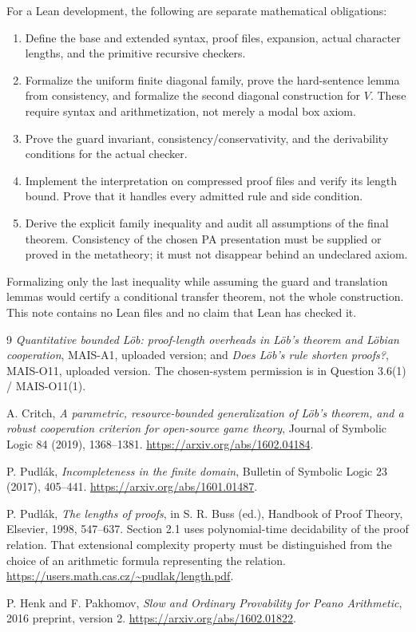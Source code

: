 \documentclass[11pt]{article}
\theoremstyle{remark}
\begin{document}
For a Lean development, the following are separate mathematical obligations:
\begin{enumerate}
\item Define the base and extended syntax, proof files, expansion, actual
character lengths, and the primitive recursive checkers.
\item Formalize the uniform finite diagonal family, prove the hard-sentence
lemma from consistency, and formalize the second diagonal construction for
$V$. These require syntax and arithmetization, not merely a modal box axiom.
\item Prove the guard invariant, consistency/conservativity, and the
derivability conditions for the actual checker.
\item Implement the interpretation on compressed proof files and verify its
length bound. Prove that it handles every admitted rule and side condition.
\item Derive the explicit family inequality and audit all assumptions of the
final theorem. Consistency of the chosen PA presentation must be supplied
or proved in the metatheory; it must not disappear behind an undeclared axiom.
\end{enumerate}
Formalizing only the last inequality while assuming the guard and translation
lemmas would certify a conditional transfer theorem, not the whole construction.
This note contains no Lean files and no claim that Lean has checked it.

\begingroup\small
\begin{thebibliography}{9}
\emph{Quantitative bounded L\"ob: proof-length overheads in L\"ob's theorem
and L\"obian cooperation}, MAIS-A1, uploaded version; and
\emph{Does L\"ob's rule shorten proofs?}, MAIS-O11, uploaded version.
The chosen-system permission is in Question 3.6(1) / MAIS-O11(1).

A. Critch, \emph{A parametric, resource-bounded generalization of L\"ob's
theorem, and a robust cooperation criterion for open-source game theory},
Journal of Symbolic Logic 84 (2019), 1368--1381.
\url{https://arxiv.org/abs/1602.04184}.

P. Pudl\'ak, \emph{Incompleteness in the finite domain},
Bulletin of Symbolic Logic 23 (2017), 405--441.
\url{https://arxiv.org/abs/1601.01487}.

P. Pudl\'ak, \emph{The lengths of proofs}, in S. R. Buss (ed.),
Handbook of Proof Theory, Elsevier, 1998, 547--637.
Section 2.1 uses polynomial-time decidability of the proof relation.
That extensional complexity property must be distinguished from the choice
of an arithmetic formula representing the relation.
\url{https://users.math.cas.cz/~pudlak/length.pdf}.

P. Henk and F. Pakhomov, \emph{Slow and Ordinary Provability for Peano
Arithmetic}, 2016 preprint, version 2.
\url{https://arxiv.org/abs/1602.01822}.
\end{thebibliography}
\endgroup
\end{document}
